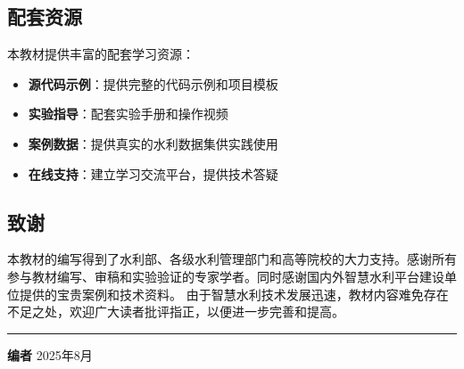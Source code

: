 \subsection{配套资源}\label{ux914dux5957ux8d44ux6e90-1} 本教材提供丰富的配套学习资源： \begin{itemize} \tightlist \item
\textbf{源代码示例}：提供完整的代码示例和项目模板 \item \textbf{实验指导}：配套实验手册和操作视频 \item \textbf{案例数据}：提供真实的水利数据集供实践使用 \item
\textbf{在线支持}：建立学习交流平台，提供技术答疑 \end{itemize} \subsection{致谢}\label{ux81f4ux8c22-1}
本教材的编写得到了水利部、各级水利管理部门和高等院校的大力支持。感谢所有参与教材编写、审稿和实验验证的专家学者。同时感谢国内外智慧水利平台建设单位提供的宝贵案例和技术资料。
由于智慧水利技术发展迅速，教材内容难免存在不足之处，欢迎广大读者批评指正，以便进一步完善和提高。 \begin{center}\rule{0.5\linewidth}{0.5pt}\end{center} \textbf{编者}
2025年8月
